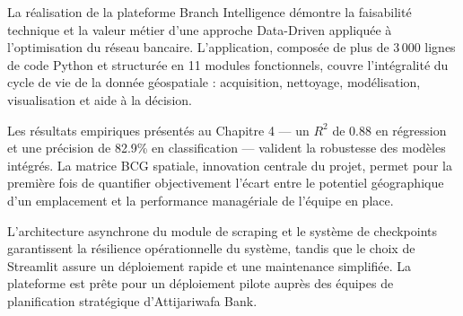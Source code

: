 La réalisation de la plateforme Branch Intelligence démontre la faisabilité technique et la valeur métier d'une approche Data-Driven appliquée à l'optimisation du réseau bancaire. L'application, composée de plus de 3\,000 lignes de code Python et structurée en 11 modules fonctionnels, couvre l'intégralité du cycle de vie de la donnée géospatiale : acquisition, nettoyage, modélisation, visualisation et aide à la décision.

Les résultats empiriques présentés au Chapitre 4 --- un $R^2$ de 0.88 en régression et une précision de 82.9\% en classification --- valident la robustesse des modèles intégrés. La matrice BCG spatiale, innovation centrale du projet, permet pour la première fois de quantifier objectivement l'écart entre le potentiel géographique d'un emplacement et la performance managériale de l'équipe en place.

L'architecture asynchrone du module de scraping et le système de checkpoints garantissent la résilience opérationnelle du système, tandis que le choix de Streamlit assure un déploiement rapide et une maintenance simplifiée. La plateforme est prête pour un déploiement pilote auprès des équipes de planification stratégique d'Attijariwafa Bank.
